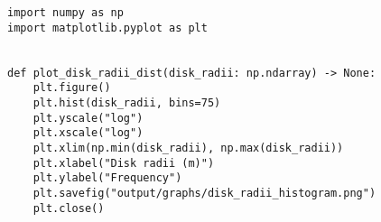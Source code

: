 \begin{lstlisting}
import numpy as np
import matplotlib.pyplot as plt


def plot_disk_radii_dist(disk_radii: np.ndarray) -> None:
    plt.figure()
    plt.hist(disk_radii, bins=75)
    plt.yscale("log")
    plt.xscale("log")
    plt.xlim(np.min(disk_radii), np.max(disk_radii))
    plt.xlabel("Disk radii (m)")
    plt.ylabel("Frequency")
    plt.savefig("output/graphs/disk_radii_histogram.png")
    plt.close()
\end{lstlisting}